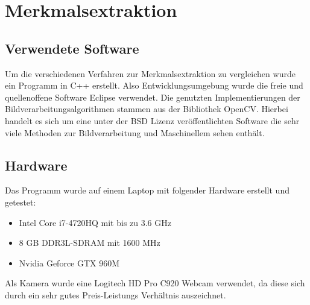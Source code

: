 \chapter{Merkmalsextraktion}

\section{Verwendete Software}

Um die verschiedenen Verfahren zur Merkmalsextraktion zu vergleichen wurde ein Programm in C++ erstellt.
Also Entwicklungsumgebung wurde die freie und quellenoffene Software Eclipse verwendet.
Die genutzten Implementierungen der Bildverarbeitungsalgorithmen stammen aus der Bibliothek OpenCV. Hierbei handelt es sich um eine unter der BSD Lizenz veröffentlichten Software die sehr viele Methoden zur Bildverarbeitung und Maschinellem sehen enthält.

\section{Hardware}

Das Programm wurde auf einem Laptop mit folgender Hardware erstellt und getestet:
\begin{itemize}
\item Intel Core i7-4720HQ mit bis zu 3.6 GHz
\item 8 GB DDR3L-SDRAM mit 1600 MHz
\item Nvidia Geforce GTX 960M
\end{itemize}

Als Kamera wurde eine Logitech HD Pro C920 Webcam verwendet, da diese sich durch ein sehr gutes Preis-Leistungs Verhältnis auszeichnet.

